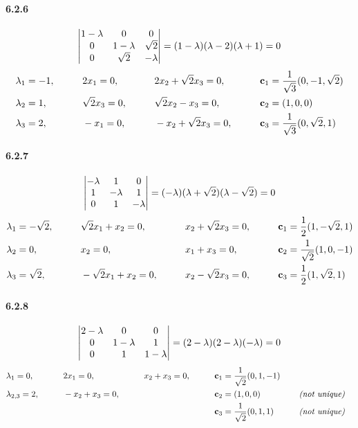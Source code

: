 \documentclass[a4paper]{article}
\begin{document}
\paragraph{6.2.6}
\[
\begin{vmatrix}
 1-\lambda& 0& 0\\
 0& 1-\lambda& \sqrt{2}\\
 0&\sqrt{2} & -\lambda
\end{vmatrix}=
(1-\lambda)(\lambda-2)(\lambda+1)=0
\]
\begin{alignat*}{4}
    & \lambda_1=-1 ,\qquad && 2x_1=0,\qquad && 2x_2+\sqrt{2}x_3=0,\qquad && \mathbf{c}_1=\frac{1}{\sqrt{3}}(0,-1,\sqrt{2})\\
    & \lambda_2=1 ,\qquad && \sqrt{2}x_3=0,\qquad && \sqrt{2}x_2-x_3=0,\qquad && \mathbf{c}_2=(1,0,0)\\
    & \lambda_3=2 ,\qquad && -x_1=0,\qquad && -x_2+\sqrt{2}x_3=0,\qquad && \mathbf{c}_3=\frac{1}{\sqrt{3}}(0,\sqrt{2},1)\\
\end{alignat*}

\paragraph{6.2.7}
\[
\begin{vmatrix}
 -\lambda&1 &0 \\
 1& -\lambda&1 \\
 0& 1& -\lambda
\end{vmatrix}=
(-\lambda)(\lambda+\sqrt{2})(\lambda-\sqrt{2})=0
\]
\begin{alignat*}{4}
    & \lambda_1=-\sqrt{2} ,\qquad && \sqrt{2}x_1+x_2=0,\qquad && x_2+\sqrt{2}x_3=0,\qquad && \mathbf{c}_1=\frac{1}{2}(1,-\sqrt{2},1)\\
    & \lambda_2=0 ,\qquad && x_2=0,\qquad && x_1+x_3=0,\qquad && \mathbf{c}_2=\frac{1}{\sqrt{2}}(1,0,-1)\\
    & \lambda_3=\sqrt{2} ,\qquad && -\sqrt{2}x_1+x_2=0,\qquad && x_2-\sqrt{2}x_3=0,\qquad && \mathbf{c}_3=\frac{1}{2}(1,\sqrt{2},1)\\
\end{alignat*}

\paragraph{6.2.8}
\[
\begin{vmatrix}
 2-\lambda&0 &0 \\
 0& 1-\lambda&1 \\
 0&1 & 1-\lambda
\end{vmatrix}=
(2-\lambda)(2-\lambda)(-\lambda)=0
\]
\begin{alignat*}{5}
    & \lambda_1=0 ,\qquad && 2x_1=0,\qquad && x_2+x_3=0,\qquad && \mathbf{c}_1=\frac{1}{\sqrt{2}}(0,1,-1)\\
    & \lambda_{2,3}=2 ,\qquad && -x_2+x_3=0,\qquad && \qquad && \mathbf{c}_2=(1,0,0)\qquad&&\textit{(not unique)}\\
    &\qquad && \qquad && \qquad && \mathbf{c}_3=\frac{1}{\sqrt{2}}(0,1,1)\qquad&&\textit{(not unique)}\\
\end{alignat*}
\end{document}
